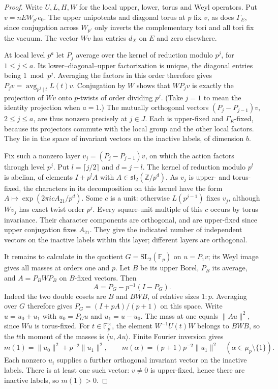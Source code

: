 \documentclass[11pt,a4paper]{article}
\numberwithin{equation}{section}
\theoremstyle{remark}
\begin{document}
\begin{proof}
Write $U,L,H,W$ for the local upper, lower, torus and Weyl operators.
Put $v=nE W_{p'}e_0$. The upper unipotents and diagonal
torus at $p$ fix $v$, as does $\Gamma_E$, since conjugation across $W_{p'}$
only inverts the complementary tori and all tori fix the vacuum.
The vector $Wv$ has entries $d_X$ on $E$ and zero elsewhere.

At local level $p^a$ let $P_j$ average over the kernel of reduction
modulo $p^j$, for $1\le j\le a$. Its lower--diagonal--upper
factorization is unique, the diagonal entries being $1\bmod p^j$.
Averaging the factors in this order therefore gives
$P_jv=\operatorname{avg}_{p^j\mid t}L(t)v$. Conjugation by $W$
shows that $W P_jv$ is exactly the projection of $Wv$ onto
$p$-twists of order dividing $p^j$. (Take $j=1$ to mean the identity
projection when $a=1$.) The mutually orthogonal vectors
$(P_j-P_{j-1})v$, $2\le j\le a$, are thus nonzero precisely at
$j\in J$. Each is upper-fixed and $\Gamma_E$-fixed, because its
projectors commute with the local group and the other local factors.
They lie in the space of invariant vectors on the inactive labels,
of dimension $b$.

Fix such a nonzero layer $v_j=(P_j-P_{j-1})v$, on which the action
factors through level $p^j$. Put $l=\lceil j/2\rceil$ and $d=j-l$.
The kernel of reduction modulo $p^l$ is abelian, of elements
$I+p^l A$ with $A\in\mathfrak{sl}_2(\mathbb Z/p^d)$.
As $v_j$ is upper- and torus-fixed, the characters in its decomposition
on this kernel have the form $A\mapsto\exp(2\pi i cA_{21}/p^d)$.
Some $c$ is a unit: otherwise $L(p^{j-1})$ fixes $v_j$, although
$Wv_j$ has exact twist order $p^j$. Every square-unit multiple of
this $c$ occurs by torus invariance. Their character components are
orthogonal, and are upper-fixed since upper conjugation fixes $A_{21}$.
They give the indicated number of independent vectors on the inactive
labels within this layer; different layers are orthogonal.

It remains to calculate in the quotient $G=\mathrm{SL}_2(\mathbb F_p)$
on $u=P_1v$; its Weyl image gives all masses at orders one and $p$.
Let $B$ be its upper Borel, $P_B$ its average, and
$A=P_B W P_B$ on $B$-fixed vectors. Then
\[
    A=P_G-p^{-1}(I-P_G).
\]
Indeed the two double cosets are $B$ and $BWB$, of relative sizes
$1:p$. Averaging over $G$ therefore gives
$P_G=(I+pA)/(p+1)$ on this space. Write
$u=u_0+u_1$ with $u_0=P_Gu$ and $u_1=u-u_0$.
The mass at one equals $\|Au\|^2$, since $Wu$ is torus-fixed.
For $t\in\mathbb F_p^\times$, the element $W^{-1}U(t)W$ belongs
to $BWB$, so the $t$th moment of the masses is $\langle u,Au\rangle$.
Finite Fourier inversion gives
\[
   m(1)=\|u_0\|^2+p^{-2}\|u_1\|^2,\qquad
   m(\alpha)=(p+1)p^{-2}\|u_1\|^2
                   \quad(\alpha\in\mu_p\setminus\{1\}).
\]
Each nonzero $u_i$ supplies a further orthogonal invariant vector on
the inactive labels. There is at least one such vector: $v\ne0$ is
upper-fixed, hence there are inactive labels, so $m(1)>0$.
\end{proof}
\end{document}
